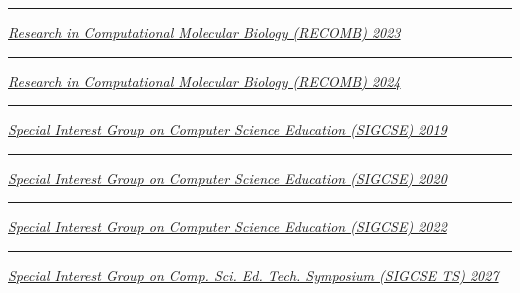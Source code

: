 \documentclass[margin,line]{res}
\begin{document}
\begin{resume}
\rule{-1mm}{5mm} \hspace*{4mm} \href{https://recomb.org/recomb2023/}{\textit{Research in Computational Molecular Biology (RECOMB) 2023}}\\
\rule{-1mm}{5mm} \hspace*{4mm} \href{https://recomb.org/recomb2024/}{\textit{Research in Computational Molecular Biology (RECOMB) 2024}}\\
\rule{-1mm}{5mm} \hspace*{4mm} \href{https://sigcse2019.sigcse.org/}{\textit{Special Interest Group on Computer Science Education (SIGCSE) 2019}}\\
\rule{-1mm}{5mm} \hspace*{4mm} \href{https://sigcse2020.sigcse.org/}{\textit{Special Interest Group on Computer Science Education (SIGCSE) 2020}}\\
\rule{-1mm}{5mm} \hspace*{4mm} \href{https://sigcse2020.sigcse.org/}{\textit{Special Interest Group on Computer Science Education (SIGCSE) 2022}}\\
\rule{-1mm}{5mm} \hspace*{4mm} \href{https://2027.sigcse-ts.acm.org/}{\textit{Special Interest Group on Comp. Sci. Ed. Tech. Symposium (SIGCSE TS) 2027}}\\


\end{resume}
\end{document}
